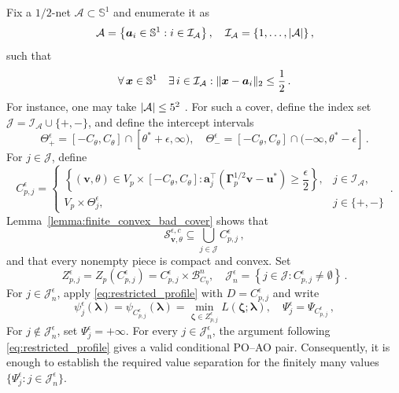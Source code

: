 \documentclass{article}
\makeatletter
\theoremstyle{definition}
\newcommand{\vnorm}[1]{%
	\ensuremath{%
		\if@display
		\left\| #1 \right\|
		\else
		\| #1 \|
		\fi
	}%
}
\newcommand{\abs}[1]{%
	\ensuremath{%
		\if@display
		\left| #1 \right|
		\else
		\lvert #1 \rvert
		\fi
	}%
}
\newcommand*{\bb}{\boldsymbol}
\def\bu{\bb{u}}
\def\bv{\bb{v}}
\def\blambda{\bb{\lambda}}
\makeatother
\begin{document}
\begin{bibunit}
Fix a $1/2$-net $\mathcal A\subset\mathbb S^1$ and enumerate it as
$$
    \mathcal A
    =
    \left\{
        \bb a_i\in\mathbb S^1:
        i\in\mathcal I_{\mathcal A}
    \right\},
    \quad
    \mathcal I_{\mathcal A}
    =
    \{1,\ldots,\abs{\mathcal A}\}\,,
$$
such that
$$
    \forall\,\bb x\in\mathbb S^1
    \quad
    \exists\,i\in\mathcal I_{\mathcal A}:
    \vnorm{\bb x-\bb a_i}_2\leq\frac12 \,.
$$
For instance, one may take
$\abs{\mathcal A}\leq5^2$
\citep[Corollary~4.2.13]{vershynin:2018}. For such a cover, define the index set
$
    \mathcal J
    =
    \mathcal I_{\mathcal A}\cup\{+,-\}
$, and define the intercept intervals
$$
    \Theta_+^\epsilon
    =
    [-C_\theta,C_\theta]
    \cap
    [\theta^*+\epsilon,\infty),
    \quad
    \Theta_-^\epsilon
    =
    [-C_\theta,C_\theta]
    \cap
    (-\infty,\theta^*-\epsilon] \,.
$$
For $j\in\mathcal J$, define
\begin{equation}
\label{eq:finite_bad_pieces}
    C_{p,j}^{\epsilon}
    =
    \begin{cases}
        \left\{
            (\bv,\theta)
            \in
            V_p\times[-C_\theta,C_\theta]:
            \bb a_j^\top
            \left(
                \bb\Gamma_p^{1/2}\bv-\bu^*
            \right)
            \geq
            \dfrac{\epsilon}{2}
        \right\},
        & j\in\mathcal I_{\mathcal A},
        \\[3ex]
        V_p\times\Theta_j^\epsilon,
        & j\in\{+,-\}
    \end{cases}\,.
\end{equation}
Lemma~\ref{lemma:finite_convex_bad_cover} shows that
$$
    \mathcal S_{\bv,\theta}^{\epsilon,c}
    \subseteq
    \bigcup_{j\in\mathcal J}C_{p,j}^{\epsilon}\,,
$$
and that every nonempty piece is compact and convex.
Set
$$
    Z_{p,j}^{\epsilon}
    =
    Z_p(C_{p,j}^{\epsilon})
    =
    C_{p,j}^{\epsilon}\times\mathcal B^n_{C_\eta},
    \quad
    \mathcal J_n^\epsilon
    =
    \left\{
        j\in\mathcal J:
        C_{p,j}^{\epsilon}\neq\emptyset
    \right\}
    \,.
$$
For $j\in\mathcal J_n^\epsilon$, apply
\eqref{eq:restricted_profile} with $D=C_{p,j}^{\epsilon}$ and write
$$
    \psi_j^\epsilon(\blambda)
    =
    \psi_{C_{p,j}^{\epsilon}}(\blambda)
    =
    \underset{\bb\zeta\in Z_{p,j}^{\epsilon}}{\min}
    L(\bb\zeta;\blambda),
    \quad
    \Psi_j^\epsilon
    =
    \Psi_{C_{p,j}^{\epsilon}} \,,
$$
For $j\notin\mathcal J_n^\epsilon$, set
$\Psi_j^\epsilon=+\infty$. For every
$j\in\mathcal J_n^\epsilon$, the argument following
\eqref{eq:restricted_profile} gives a valid conditional PO--AO pair.
Consequently, it is enough to establish the required value separation
for the finitely many values
$\{\Psi_j^\epsilon:j\in\mathcal J_n^\epsilon\}$.


\end{bibunit}
\end{document}
